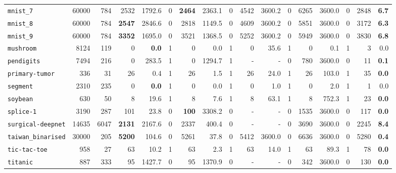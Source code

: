 \begin{tabular}{lccrrrrrrrrrrrrrr}
\texttt{mnist\_7} & \multicolumn{1}{r}{60000} & \multicolumn{1}{r}{784}  & 2532 & 1792.6 & 0 & \textbf{2464} & 2363.1 & 0 & 4542 & 3600.2 & 0 & 6265 & 3600.0 & 0 & 2848 & \textbf{6.7}\\
\texttt{mnist\_8} & \multicolumn{1}{r}{60000} & \multicolumn{1}{r}{784}  & \textbf{2547} & 2846.6 & 0 & 2818 & 1149.5 & 0 & 4609 & 3600.2 & 0 & 5851 & 3600.0 & 0 & 3172 & \textbf{6.3}\\
\texttt{mnist\_9} & \multicolumn{1}{r}{60000} & \multicolumn{1}{r}{784}  & \textbf{3352} & 1695.0 & 0 & 3521 & 1368.5 & 0 & 5252 & 3600.2 & 0 & 5949 & 3600.0 & 0 & 3830 & \textbf{6.8}\\
\texttt{mushroom} & \multicolumn{1}{r}{8124} & \multicolumn{1}{r}{119}  & 0 & \textbf{0.0} & 1 & 0 & 0.0 & 1 & 0 & 35.6 & 1 & 0 & 0.1 & 1 & 3 & 0.0\\
\texttt{pendigits} & \multicolumn{1}{r}{7494} & \multicolumn{1}{r}{216}  & 0 & 283.5 & 1 & 0 & 1294.7 & 1 & - & - & 0 & 780 & 3600.0 & 0 & 11 & \textbf{0.1}\\
\texttt{primary-tumor} & \multicolumn{1}{r}{336} & \multicolumn{1}{r}{31}  & 26 & 0.4 & 1 & 26 & 1.5 & 1 & 26 & 24.0 & 1 & 26 & 103.0 & 1 & 35 & \textbf{0.0}\\
\texttt{segment} & \multicolumn{1}{r}{2310} & \multicolumn{1}{r}{235}  & 0 & \textbf{0.0} & 1 & 0 & 0.0 & 1 & 0 & 1.0 & 1 & 0 & 2.0 & 1 & 1 & 0.0\\
\texttt{soybean} & \multicolumn{1}{r}{630} & \multicolumn{1}{r}{50}  & 8 & 19.6 & 1 & 8 & 7.6 & 1 & 8 & 63.1 & 1 & 8 & 752.3 & 1 & 23 & \textbf{0.0}\\
\texttt{splice-1} & \multicolumn{1}{r}{3190} & \multicolumn{1}{r}{287}  & 101 & 23.8 & 0 & \textbf{100} & 3308.2 & 0 & - & - & 0 & 1535 & 3600.0 & 0 & 117 & \textbf{0.0}\\
\texttt{surgical-deepnet} & \multicolumn{1}{r}{14635} & \multicolumn{1}{r}{6047}  & \textbf{2131} & 2167.6 & 0 & 2337 & 400.4 & 0 & - & - & 0 & 3690 & 3600.0 & 0 & 2245 & \textbf{8.4}\\
\texttt{taiwan\_binarised} & \multicolumn{1}{r}{30000} & \multicolumn{1}{r}{205}  & \textbf{5200} & 104.6 & 0 & 5261 & 37.8 & 0 & 5412 & 3600.0 & 0 & 6636 & 3600.0 & 0 & 5280 & \textbf{0.4}\\
\texttt{tic-tac-toe} & \multicolumn{1}{r}{958} & \multicolumn{1}{r}{27}  & 63 & 10.2 & 1 & 63 & 2.3 & 1 & 63 & 14.0 & 1 & 63 & 89.3 & 1 & 78 & \textbf{0.0}\\
\texttt{titanic} & \multicolumn{1}{r}{887} & \multicolumn{1}{r}{333}  & 95 & 1427.7 & 0 & 95 & 1370.9 & 0 & - & - & 0 & 342 & 3600.0 & 0 & 130 & \textbf{0.0}\\

\end{tabular}
